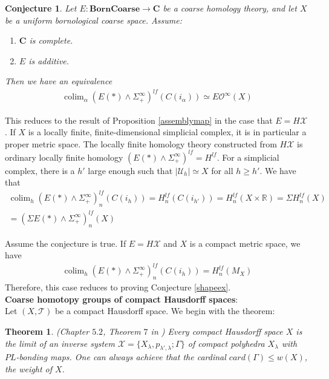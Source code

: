 \documentclass[a4paper,11pt]{article}
\theoremstyle{definition}
\theoremstyle{plain}
\newtheorem{theorem}[definition]{Theorem}
\newtheorem{conjecture}[definition]{Conjecture}
\theoremstyle{remark}
\DeclareMathOperator{\colim}{colim}
\begin{document}
{ \begin{conjecture} Let $E:\mathbf{BornCoarse}\rightarrow \mathbf{C}$ be a coarse homology theory, and let $X$ be a uniform bornological coarse space. Assume:
 \begin{enumerate}
 \item $\mathbf{C}$ is complete. 
 \item $E$ is additive. 
\end{enumerate}
Then we have an equivalence 
 \begin{align*}
 \colim_{\alpha} (E(\ast) \wedge \Sigma_{+}^{\infty})^{lf}(C(i_{\alpha}))\simeq E\mathcal{O}^{\infty}(X)
 \end{align*}
 \end{conjecture}
 
This reduces to the result of Proposition \ref{assemblymap} in the case that $E = H\mathcal{X}$. If $X$ is a locally finite, finite-dimensional simplicial complex, it is in particular a proper metric space. The locally finite homology theory constructed from $H\mathcal{X}$ is ordinary locally finite homology $ (E(\ast) \wedge \Sigma_{+}^{\infty})^{lf} = H^{lf}$. For a simplicial complex, there is a $h'$ large enough such that $|\mathcal{U}_{h}|\simeq X$ for all $h\geq h'$. We have that
 \begin{align*}
 \colim_{h}(E(\ast) \wedge \Sigma_{+}^{\infty})^{lf}_{n}(C(i_{h})) = H_{n}^{lf}(C(i_{h'})) = H_{n}^{lf}(X\times \mathbb{R}) = \Sigma H_{n}^{lf} (X) \\
 = (\Sigma E(\ast) \wedge \Sigma_{+}^{\infty})^{lf}_{n}(X)
 \end{align*}
 
Assume the conjecture is true. If $E = H\mathcal{X}$ and $X$ is a compact metric space, we have
 \begin{align*}
 \colim_{h}(E(\ast) \wedge \Sigma_{+}^{\infty})^{lf}_{n}(C(i_{h})) = H_{n}^{lf}(M_{X}) 
\end{align*}
Therefore, this case reduces to proving Conjecture \ref{shapeex}. \\

 \textbf{Coarse homotopy groups of compact Hausdorff spaces}:\\

Let $(X, \mathcal{T})$ be a compact Hausdorff space. We begin with the theorem: 

\begin{theorem} (Chapter $5.2$, Theorem $7$ in \cite{mardesic1982shape}) Every compact Hausdorff space $X$ is the limit of an inverse system $\mathcal{X} = \{X_{\lambda}, p_{\lambda',\lambda}; \Gamma\}$ of compact polyhedra $X_{\lambda}$ with $PL$-bonding maps. One can always achieve that the cardinal $card(\Gamma) \leq w(X)$, the weight of $X$.
\end{theorem}

}
\end{document}

